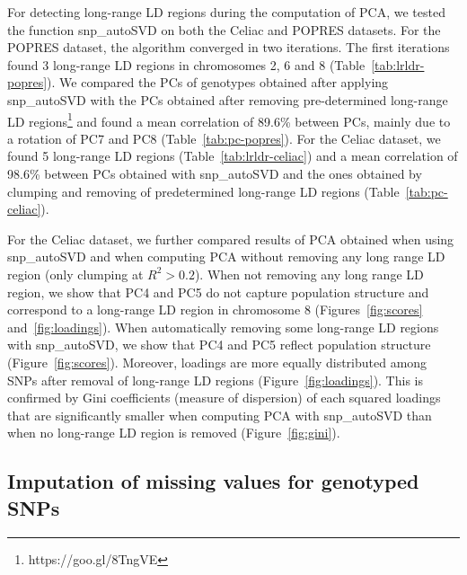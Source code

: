 \documentclass{bioinfo}
\begin{document}
For detecting long-range LD regions during the computation of PCA, we tested the function snp\_autoSVD on both the Celiac and POPRES datasets. For the POPRES dataset, the algorithm converged in two iterations. The first iterations found 3 long-range LD regions in chromosomes 2, 6 and 8 (Table~\ref{tab:lrldr-popres}). 
We compared the PCs of genotypes obtained after applying snp\_autoSVD with the PCs obtained after removing pre-determined long-range LD regions\footnote{https://goo.gl/8TngVE} and found a mean correlation of 89.6\% between PCs, mainly due to a rotation of PC7 and PC8 (Table~\ref{tab:pc-popres}). 
For the Celiac dataset, we found 5 long-range LD regions (Table~\ref{tab:lrldr-celiac}) and a mean correlation of 98.6\% between PCs obtained with snp\_autoSVD and the ones obtained by clumping and removing of predetermined long-range LD regions (Table~\ref{tab:pc-celiac}).

For the Celiac dataset, we further compared results of PCA obtained when using snp\_autoSVD and when computing PCA without removing any long range LD region (only clumping at $R^2 > 0.2$). 
When not removing any long range LD region, we show that PC4 and PC5 do not capture population structure and correspond to a long-range LD region in chromosome 8 (Figures~\ref{fig:scores} and~\ref{fig:loadings}). 
When automatically removing some long-range LD regions with snp\_autoSVD, we show that PC4 and PC5 reflect population structure (Figure~\ref{fig:scores}). Moreover, loadings are more equally distributed among SNPs after removal of long-range LD regions (Figure~\ref{fig:loadings}). 
This is confirmed by Gini coefficients (measure of dispersion) of each squared loadings that are significantly smaller when computing PCA with snp\_autoSVD than when no long-range LD region is removed (Figure~\ref{fig:gini}).

\subsection{Imputation of missing values for genotyped SNPs}\label{sec:impute}
\end{document}
